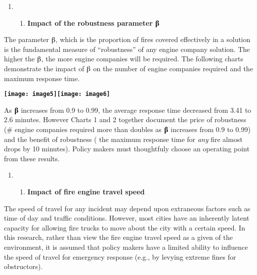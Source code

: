 \documentclass{article} %
\begin{document}
\noindent \textbf{}

\begin{enumerate}
\item \begin{enumerate}
\item \textbf{ Impact of the robustness parameter  $\boldsymbol{\betaup}$}
\end{enumerate}
\end{enumerate}

\noindent The parameter $\betaup$, which is the proportion of fires covered effectively in a solution is the fundamental measure of ``robustness'' of any engine company solution.  The higher the $\betaup$, the more engine companies will be required.  The following charts demonstrate the impact of $\betaup$ on the number of engine companies required and the maximum response time.

\noindent \textbf{\texttt{[image: image5]}\texttt{[image: image6]}}

\noindent As \textbf{$\boldsymbol{\betaup}$ }increases from 0.9 to 0.99, the average response time decreased from 3.41 to 2.6 minutes.  However Charts 1 and 2 together document the price of robustness (\# engine companies required more than doubles as \textbf{$\boldsymbol{\betaup}$} increases from 0.9 to 0.99) and the benefit of robustness ( the maximum response time for \textit{any} fire almost drops by 10 minutes).  Policy makers must thoughtfuly choose an operating point from these results.

\noindent 

\begin{enumerate}
\item \begin{enumerate}
\item  \textbf{Impact of fire engine travel speed}
\end{enumerate}
\end{enumerate}

\noindent The speed of travel for any incident may depend upon extraneous factors such as time of day and traffic conditions.  However, most cities have an inherently latent capacity for allowing fire trucks to move about the city with a certain speed.  In this research, rather than view the fire engine travel speed as a given of the environment, it is assumed that policy makers have a limited ability to influence the speed of travel for emergency response (e.g., by levying extreme fines for obstructors).
\end{document}
